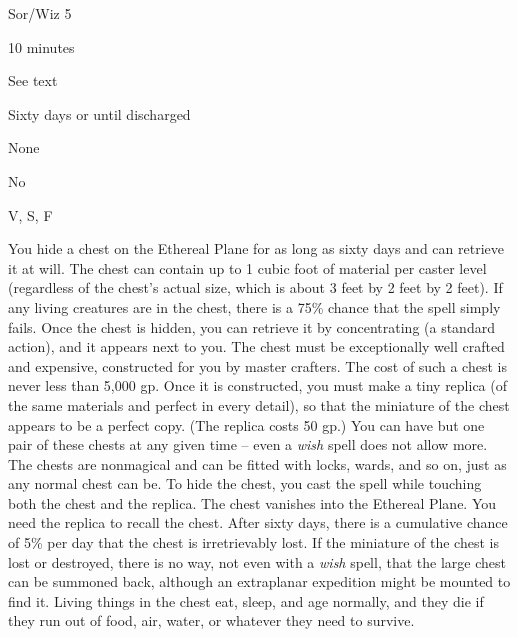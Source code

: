 
\begin{description*}
\item[Level:] Sor/Wiz 5
\item[Casting Time:] 10 minutes
\item[Range:] See text
\item[Duration:] Sixty days or until discharged
\item[Saving Throw:] None
\item[Spell Resistance:] No
\item[Components:] V, S, F
\end{description*}

You hide a chest on the Ethereal Plane for as long as sixty days and can retrieve
it at will. The chest can contain up to 1 cubic foot of material per caster level
(regardless of the chest's actual size, which is about 3 feet by 2 feet by 2 feet).
If any living creatures are in the chest, there is a 75\% chance that the spell
simply fails. Once the chest is hidden, you can retrieve it by concentrating (a
standard action), and it appears next to you.
The chest must be exceptionally well crafted and expensive, constructed for you
by master crafters. The cost of such a chest is never less than 5,000 gp. Once
it is constructed, you must make a tiny replica (of the same materials and perfect
in every detail), so that the miniature of the chest appears to be a perfect copy.
(The replica costs 50 gp.) You can have but one pair of these chests at any given
time -- even a \textit{wish} spell does not allow more. The chests are nonmagical
and can be fitted with locks, wards, and so on, just as any normal chest can be.
To hide the chest, you cast the spell while touching both the chest and the replica.
The chest vanishes into the Ethereal Plane. You need the replica to recall the
chest. After sixty days, there is a cumulative chance of 5\% per day that the chest
is irretrievably lost. If the miniature of the chest is lost or destroyed, there
is no way, not even with a \textit{wish} spell, that the large chest can be summoned
back, although an extraplanar expedition might be mounted to find it.
Living things in the chest eat, sleep, and age normally, and they die if they run
out of food, air, water, or whatever they need to survive.